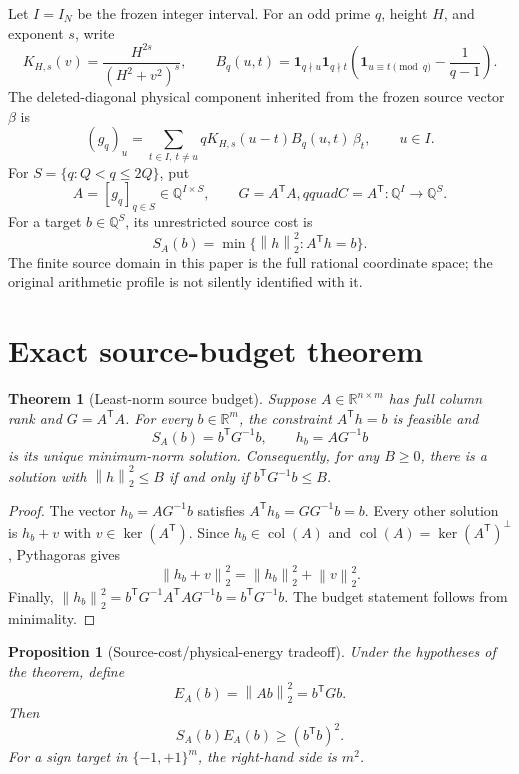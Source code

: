 \documentclass[10pt]{article}
\newtheorem{theorem}{Theorem}
\newtheorem{proposition}{Proposition}
\newcommand{\Q}{\mathbb{Q}}
\newcommand{\R}{\mathbb{R}}
\newcommand{\norm}[1]{\left\lVert #1\right\rVert}
\begin{document}
Let $I=I_N$ be the frozen integer interval.  For an odd prime $q$, height
$H$, and exponent $s$, write
\[
 K_{H,s}(v)=\frac{H^{2s}}{(H^2+v^2)^s},\qquad
 B_q(u,t)=\mathbf 1_{q\nmid u}\mathbf 1_{q\nmid t}
 \left(\mathbf 1_{u\equiv t\pmod q}-\frac1{q-1}\right).
\]
The deleted-diagonal physical component inherited from the frozen source
vector $\beta$ is
\[
 (g_q)_u=\sum_{t\in I,\ t\ne u}
 qK_{H,s}(u-t)B_q(u,t)\,\beta_t,\qquad u\in I.
 \label{eq:physical}
\]
For $S=\{q:Q<q\le 2Q\}$, put
\[
 A=[g_q]_{q\in S}\in\Q^{I\times S},\qquad G=A^{\mathsf T}A,qquad
 C=A^{\mathsf T}:\Q^I\to\Q^S.
 \label{eq:matrix}
\]
For a target $b\in\Q^S$, its unrestricted source cost is
\[
 S_A(b)=\min\{\norm{h}_2^2:A^{\mathsf T}h=b\}.
 \label{eq:cost}
\]
The finite source domain in this paper is the full rational coordinate space;
the original arithmetic profile is not silently identified with it.

\section{Exact source-budget theorem}

\begin{theorem}[Least-norm source budget]
Suppose $A\in\R^{n\times m}$ has full column rank and
$G=A^{\mathsf T}A$.  For every $b\in\R^m$, the constraint
$A^{\mathsf T}h=b$ is feasible and
\[
 S_A(b)=b^{\mathsf T}G^{-1}b,
 \qquad h_b=AG^{-1}b
 \label{eq:leastnorm}
\]
is its unique minimum-norm solution.  Consequently, for any $B\ge0$,
there is a solution with $\norm{h}_2^2\le B$ if and only if
$b^{\mathsf T}G^{-1}b\le B$.
\end{theorem}

\begin{proof}
The vector $h_b=AG^{-1}b$ satisfies
$A^{\mathsf T}h_b=GG^{-1}b=b$.  Every other solution is $h_b+v$ with
$v\in\ker(A^{\mathsf T})$.  Since $h_b\in\operatorname{col}(A)$ and
$\operatorname{col}(A)=\ker(A^{\mathsf T})^\perp$, Pythagoras gives
\[
 \norm{h_b+v}_2^2=\norm{h_b}_2^2+\norm{v}_2^2.
\]
Finally,
$\norm{h_b}_2^2=b^{\mathsf T}G^{-1}A^{\mathsf T}AG^{-1}b
=b^{\mathsf T}G^{-1}b$.  The budget statement follows from minimality.
\end{proof}

\begin{proposition}[Source-cost/physical-energy tradeoff]
Under the hypotheses of the theorem, define
\[
 E_A(b)=\norm{Ab}_2^2=b^{\mathsf T}Gb.
\]
Then
\[
 S_A(b)E_A(b)\ge (b^{\mathsf T}b)^2.
 \label{eq:tradeoff}
\]
For a sign target in $\{-1,+1\}^m$, the right-hand side is $m^2$.
\end{proposition}
\end{document}
